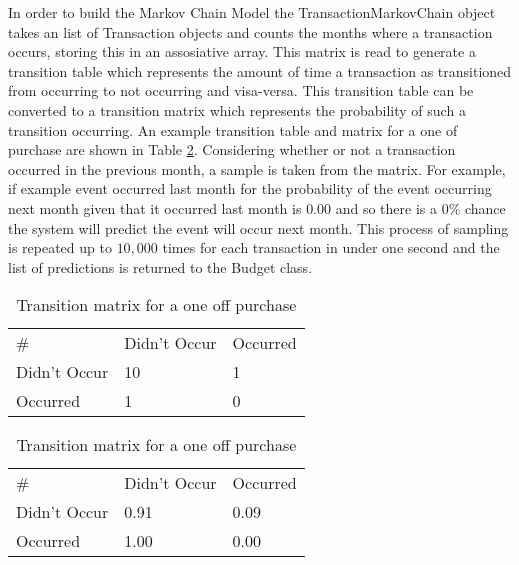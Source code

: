 In order to build the Markov Chain Model the TransactionMarkovChain object takes an list of Transaction objects and counts the months where a transaction occurs, storing this in an assosiative array. This matrix is read to generate a transition table which represents the amount of time a transaction as transitioned from occurring to not occurring and visa-versa. This transition table can be converted to a transition matrix which represents the probability of such a transition occurring. An example transition table and matrix for a one of purchase are shown in Table \ref{fig:transition-matrix}.
%
Considering whether or not a transaction occurred in the previous month, a sample is taken from the matrix. For example, if example event occurred last month for the probability of the event occurring next month given that it occurred last month is $0.00$ and so there is a 0\% chance the system will predict the event will occur next month. This process of sampling is repeated up to $10,000$ times for each transaction in under one second and the list of predictions is returned to the Budget class.

\begin{table}[!htb]

    \begin{minipage}{0.4\linewidth}
      \centering
        \begin{tabular}{lll}
        \#           & Didn't Occur & Occurred \\
        Didn't Occur & 10           & 1       \\
        Occurred     & 1            & 0      
        \end{tabular}
        \caption{Transition table for a one off purchase}
    \end{minipage} 

    \begin{minipage}{0.4\linewidth}
      \centering
        \begin{tabular}{lll}
        \#           & Didn't Occur & Occurred \\
        Didn't Occur & 0.91         & 0.09       \\
        Occurred     & 1.00         & 0.00     
        \end{tabular}
        \caption{Transition matrix for a one off purchase}
    \end{minipage}
    
    \label{fig:transition-matrix}
    
\end{table}

